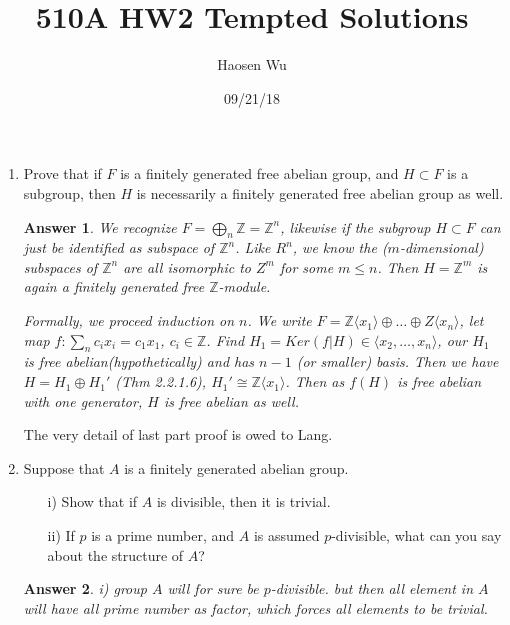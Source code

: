 \documentclass[11pt,leqno]{article}
\newcommand{\Z}{{\mathbb Z}}
\newcommand{\<}[1]{{\langle}#1 {\rangle}}
\theoremstyle{plain}
\newtheorem*{answer*}{Answer}
\theoremstyle{definition}
\theoremstyle{remark}
\numberwithin{equation}{section}
\begin{document}
\pagestyle{fancy}
\renewcommand{\sectionmark}[1]{\markright{\thesection\ #1}}
\fancyhead{}
\fancyhead[LO,R]{\bfseries\footnotesize\thepage}
\fancyhead[LE]{\bfseries\footnotesize\rightmark}
\fancyhead[RO]{\bfseries\footnotesize\rightmark}
\chead[]{}
\cfoot[]{}
\setlength{\headheight}{1cm}

\author{}
\title{{\bf 510A HW2 Tempted Solutions}}
\date{09/21/18}
\author{Haosen Wu}

\maketitle
\begin{enumerate}

\item Prove that if $F$ is a finitely generated free abelian group, and $H \subset F$ is a subgroup, then $H$ is necessarily a finitely generated free abelian group as well.
    \begin{answer*}
     We recognize  $F=\bigoplus_n\Z=\Z^n$,  likewise if the subgroup $H \subset F$ can just be identified as subspace of $\Z^n$. Like $R^n$, we know the ($m$-dimensional) subspaces of $\Z^n$ are all isomorphic to $Z^m$ for some $m\leq n$. Then $H=\Z^m$ is again a finitely generated free $\Z$-module. 
     
     Formally, we proceed induction on $n$. We write $F=\Z\langle x_1\rangle \oplus \dots \oplus Z\langle x_n\rangle$, let map $f:\sum_n{c_ix_i}=c_1x_1$, $c_i\in \Z$. Find $H_1=Ker(f|H)\in \langle x_2,\dots,x_n\rangle$, our $H_1$ is free abelian(hypothetically) and has $n-1$ (or smaller) basis. Then we have $H=H_1\oplus{H_1}'$ (Thm 2.2.1.6),   $H_1'\cong \Z\langle x_1\rangle$. Then as $f(H)$ is free abelian with one generator, $H$ is free abelian as well.
    \end{answer*} 
    The very detail of last part proof is owed to Lang.
    
\item Suppose that $A$ is a finitely generated abelian group.
\begin{itemize}[noitemsep,topsep=1pt]
\item[i)] Show that if $A$ is divisible, then it is trivial.
\item[ii)] If $p$ is a prime number, and $A$ is assumed $p$-divisible, what can you say about the structure of $A$?
\end{itemize}
    \begin{answer*}
    i) group $A$ will for sure be $p$-divisible. but then all element in $A$ will have all prime number as factor, which forces all elements to be trivial.
    

\end{answer*}
\end{enumerate}
\end{document}
